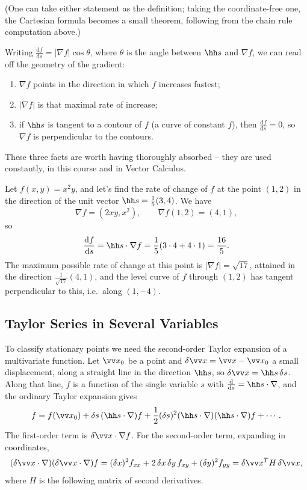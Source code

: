 (One can take either statement as the definition; taking the coordinate-free one, the Cartesian formula becomes a small theorem, following from the chain rule computation above.)

Writing $\frac{\mathrm{d}f}{\mathrm{d}s} = |\nabla f| \cos\theta$, where $\theta$ is the angle between $\hh s$ and $\nabla f$, we can read off the geometry of the gradient:
\begin{enumerate}[label=(\roman*)]
	\item $\nabla f$ points in the direction in which $f$ increases fastest;
	\item $|\nabla f|$ is that maximal rate of increase;
	\item if $\hh s$ is tangent to a contour of $f$ (a curve of constant $f$), then $\frac{\mathrm{d}f}{\mathrm{d}s} = 0$, so $\nabla f$ is perpendicular to the contours.
\end{enumerate}
These three facts are worth having thoroughly absorbed -- they are used constantly, in this course and in Vector Calculus.

\begin{example}
	Let $f(x, y) = x^2 y$, and let's find the rate of change of $f$ at the point $(1, 2)$ in the direction of the unit vector $\hh s = \frac{1}{5}(3, 4)$. We have
	$$
	\nabla f = (2xy, x^2), \qquad \nabla f(1, 2) = (4, 1),
	$$
	so
	$$
	\frac{\mathrm{d}f}{\mathrm{d}s} = \hh s \cdot \nabla f = \frac{1}{5}(3 \cdot 4 + 4 \cdot 1) = \frac{16}{5}.
	$$
	The maximum possible rate of change at this point is $|\nabla f| = \sqrt{17}$, attained in the direction $\frac{1}{\sqrt{17}}(4, 1)$, and the level curve of $f$ through $(1, 2)$ has tangent perpendicular to this, i.e.\ along $(1, -4)$.
\end{example}

\subsection{Taylor Series in Several Variables}

To classify stationary points we need the second-order Taylor expansion of a multivariate function. Let $\vv x_0$ be a point and $\delta \vv x = \vv x - \vv x_0$ a small displacement, along a straight line in the direction $\hh s$, so $\delta \vv x = \hh s \, \delta s$. Along that line, $f$ is a function of the single variable $s$ with $\frac{\mathrm{d}}{\mathrm{d}s} = \hh s \cdot \nabla$, and the ordinary Taylor expansion gives
$$
f = f(\vv x_0) + \delta s \, (\hh s \cdot \nabla) f + \frac{1}{2}(\delta s)^2 (\hh s \cdot \nabla)(\hh s \cdot \nabla) f + \cdots.
$$
The first-order term is $\delta \vv x \cdot \nabla f$. For the second-order term, expanding in coordinates,
$$
(\delta \vv x \cdot \nabla)(\delta \vv x \cdot \nabla) f = (\delta x)^2 f_{xx} + 2\, \delta x\, \delta y\, f_{xy} + (\delta y)^2 f_{yy} = \delta\vv x^T H \,\delta \vv x,
$$
where $H$ is the following matrix of second derivatives.

